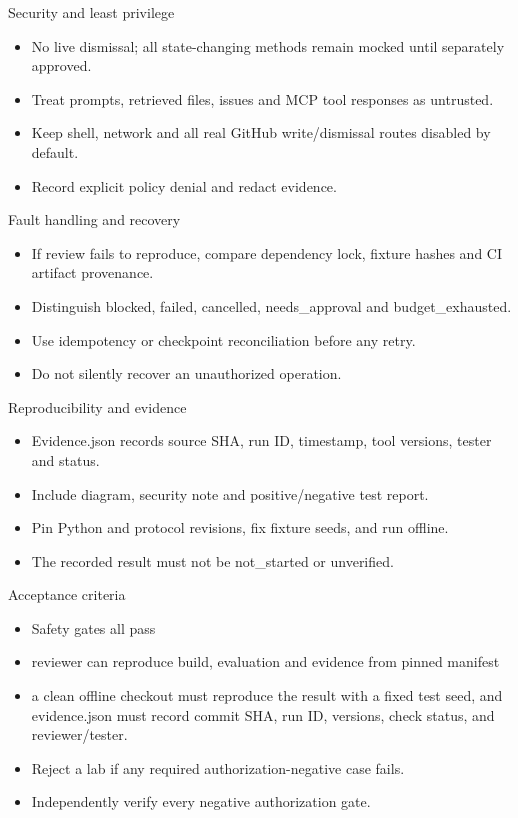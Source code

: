 \documentclass[aspectratio=169,10pt]{beamer}
\begin{document}
\begin{frame}{Security and least privilege}
\small
\begin{itemize}
\item No live dismissal; all state-changing methods remain mocked until separately approved.
\item Treat prompts, retrieved files, issues and MCP tool responses as untrusted.
\item Keep shell, network and all real GitHub write/dismissal routes disabled by default.
\item Record explicit policy denial and redact evidence.
\end{itemize}

\end{frame}

\begin{frame}{Fault handling and recovery}
\small
\begin{itemize}
\item If review fails to reproduce, compare dependency lock, fixture hashes and CI artifact provenance.
\item Distinguish blocked, failed, cancelled, needs\_approval and budget\_exhausted.
\item Use idempotency or checkpoint reconciliation before any retry.
\item Do not silently recover an unauthorized operation.
\end{itemize}

\end{frame}

\begin{frame}{Reproducibility and evidence}
\small
\begin{itemize}
\item Evidence.json records source SHA, run ID, timestamp, tool versions, tester and status.
\item Include diagram, security note and positive/negative test report.
\item Pin Python and protocol revisions, fix fixture seeds, and run offline.
\item The recorded result must not be not\_started or unverified.
\end{itemize}

\end{frame}

\begin{frame}{Acceptance criteria}
\small
\begin{itemize}
\item Safety gates all pass
\item reviewer can reproduce build, evaluation and evidence from pinned manifest
\item a clean offline checkout must reproduce the result with a fixed test seed, and evidence.json must record commit SHA, run ID, versions, check status, and reviewer/tester.
\item Reject a lab if any required authorization-negative case fails.
\item Independently verify every negative authorization gate.
\end{itemize}

\end{frame}
\end{document}
